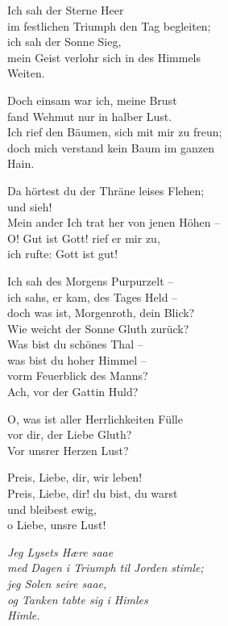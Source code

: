 \documentclass[parskip=full]{scrreprt}
\begin{document}
\begin{multicols}{2}
Ich sah der Sterne Heer\\
im festlichen Triumph den Tag begleiten;\\
ich sah der Sonne Sieg,\\
mein Geist verlohr sich in des Himmels\\
\hspace*{1em}Weiten.

Doch einsam war ich, meine Brust\\
fand Wehmut nur in halber Lust.\\
Ich rief den Bäumen, sich mit mir zu freun;\\
doch mich verstand kein Baum im ganzen\\
\hspace*{1em}Hain.

Da hörtest du der Thräne leises Flehen;\\
und sieh!\\
Mein ander Ich trat her von jenen Höhen –\\
O! Gut ist Gott! rief er mir zu,\\
ich rufte: Gott ist gut!

Ich sah des Morgens Purpurzelt –\\
ich sahs, er kam, des Tages Held –\\
doch was ist, Morgenroth, dein Blick?\\
Wie weicht der Sonne Gluth zurück?\\
Was bist du schönes Thal –\\
was bist du hoher Himmel –\\
vorm Feuerblick des Manns?\\
Ach, vor der Gattin Huld?

O, was ist aller Herrlichkeiten Fülle\\
vor dir, der Liebe Gluth?\\
Vor unsrer Herzen Lust?

Preis, Liebe, dir, wir leben!\\
Preis, Liebe, dir! du bist, du warst\\
und bleibest ewig,\\
o Liebe, unsre Lust!

\columnbreak\itshape
Jeg Lysets Hære saae\\
med Dagen i Triumph til Jorden stimle;\\
jeg Solen seire saae,\\
og Tanken tabte sig i Himles\\
\hspace*{1em}Himle.


\end{multicols}
\end{document}

